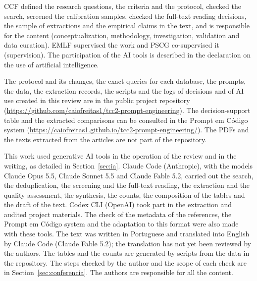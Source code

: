 \begin{declarations}

\begin{contributions}
CCF defined the research questions, the criteria and the protocol, checked the search, screened the calibration samples,
checked the full-text reading decisions, the sample of extractions and the empirical claims in the text, and
is responsible for the content (conceptualization, methodology, investigation, validation and data curation). EMLF supervised the
work and PSCG co-supervised it (supervision). The participation of the AI tools is described in the declaration on the use
of artificial intelligence.
\end{contributions}

\begin{interests}
\end{interests}

\begin{materials}
The protocol and its changes, the exact queries for each database, the prompts, the data, the extraction records, the
scripts and the logs of decisions and of AI use created in this review are in the public project repository
(\url{https://github.com/caiofreitas1/tcc2-prompt-engineering}). The decision-support table and the extracted comparisons can
be consulted in the Prompt em Código system (\url{https://caiofreitas1.github.io/tcc2-prompt-engineering/}). The PDFs
and the texts extracted from the articles are not part of the repository.
\end{materials}

\begin{aitools}
This work used generative AI tools in the operation of the review and in the writing, as detailed in
Section~\ref{sec:ia}. Claude Code (Anthropic), with the models Claude Opus 5.5, Claude Sonnet 5.5 and Claude Fable 5.2,
carried out the search, the deduplication, the screening and the full-text reading, the extraction and the quality assessment, the
synthesis, the counts, the composition of the tables and the draft of the text. Codex CLI (OpenAI) took part in the extraction
and audited project materials. The check of the metadata of the references, the Prompt em Código system and the
adaptation to this format were also made with these tools. The text was written in Portuguese and translated into English
by Claude Code (Claude Fable 5.2); the translation has not yet been reviewed by the authors. The tables and the counts are generated by
scripts from the data in the repository. The steps checked by the author and the scope of each check are in
Section~\ref{sec:conferencia}. The authors are responsible for all the content.
\end{aitools}


\end{declarations}
